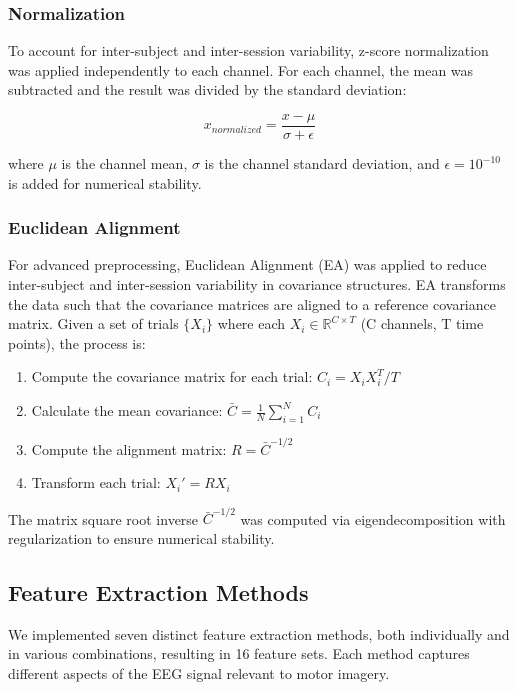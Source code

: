 \documentclass[conference]{IEEEtran}
\begin{document}
\subsubsection{Normalization}
To account for inter-subject and inter-session variability, z-score normalization was applied independently to each channel. For each channel, the mean was subtracted and the result was divided by the standard deviation:

\begin{equation}
x_{normalized} = \frac{x - \mu}{\sigma + \epsilon}
\end{equation}

where $\mu$ is the channel mean, $\sigma$ is the channel standard deviation, and $\epsilon = 10^{-10}$ is added for numerical stability.

\subsubsection{Euclidean Alignment}
For advanced preprocessing, Euclidean Alignment (EA) was applied to reduce inter-subject and inter-session variability in covariance structures. EA transforms the data such that the covariance matrices are aligned to a reference covariance matrix. Given a set of trials $\{X_i\}$ where each $X_i \in \mathbb{R}^{C \times T}$ (C channels, T time points), the process is:

\begin{enumerate}
    \item Compute the covariance matrix for each trial: $C_i = X_i X_i^T / T$
    \item Calculate the mean covariance: $\bar{C} = \frac{1}{N}\sum_{i=1}^{N} C_i$
    \item Compute the alignment matrix: $R = \bar{C}^{-1/2}$
    \item Transform each trial: $X_i' = R X_i$
\end{enumerate}

The matrix square root inverse $\bar{C}^{-1/2}$ was computed via eigendecomposition with regularization to ensure numerical stability.

\subsection{Feature Extraction Methods}

We implemented seven distinct feature extraction methods, both individually and in various combinations, resulting in 16 feature sets. Each method captures different aspects of the EEG signal relevant to motor imagery.
\end{document}
